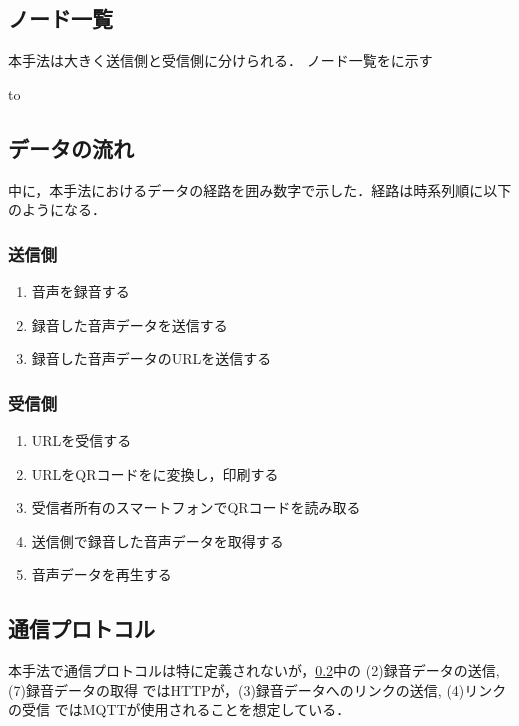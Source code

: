 \documentclass[submit,techrep,noauthor]{ipsj}
\begin{document}
\subsection{ノード一覧}
本手法は大きく送信側と受信側に分けられる．
ノード一覧をに示す

\begin{table}[tb] 
\caption{ノード一覧} 
\label{tab:sys-nodes}
\hbox to
\end{table}

\subsection{データの流れ}
\label{dataflow}
中に，本手法におけるデータの経路を囲み数字で示した．経路は時系列順に以下のようになる．
\subsubsection*{送信側}
\begin{enumerate}
    \item 音声を録音する
    \item 録音した音声データを送信する
    \item 録音した音声データのURLを送信する 
\end{enumerate}

\subsubsection*{受信側}
\begin{enumerate}
    \item URLを受信する 
    \item URLをQRコードをに変換し，印刷する 
    \item 受信者所有のスマートフォンでQRコードを読み取る 
    \item 送信側で録音した音声データを取得する 
    \item 音声データを再生する       
\end{enumerate}


\subsection{通信プロトコル}
本手法で通信プロトコルは特に定義されないが，\ref{dataflow}中の (2)録音データの送信, (7)録音データの取得 ではHTTPが，(3)録音データへのリンクの送信, (4)リンクの受信 ではMQTTが使用されることを想定している．
\end{document}
